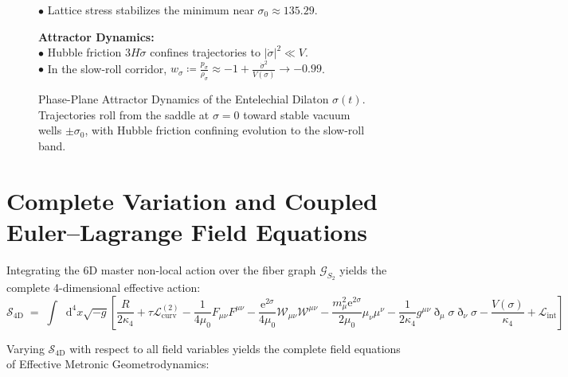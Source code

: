 \documentclass[
    12pt,
    a4paper,
    headings=normal,
    twoside=false,
    open=any,
    parskip=half
]{scrbook}
\newcommand{\ethop}{\eth}
\newcommand{\diff}{\mathop{}\!\mathrm{d}}
\newcommand{\eu}{\mathrm{e}}
\begin{document}
\begin{figure}[htbp]
\begin{tcolorbox}[colback=white, colframe=secondarycolor!70, arc=2mm, boxrule=0.7pt, left=6pt, right=6pt, top=4pt, bottom=4pt, width=\linewidth]
\begin{minipage}[t]{0.48\textwidth}
  $\bullet$ Lattice stress stabilizes the minimum near $\sigma_0 \approx 135.29$.
\end{minipage}\hfill
\begin{minipage}[t]{0.48\textwidth}
  \textbf{\color{accentcolor}Attractor Dynamics:}\\[1pt]
  $\bullet$ Hubble friction $3H\dot{\sigma}$ confines trajectories to $|\dot{\sigma}|^2 \ll V$.\\[1pt]
  $\bullet$ In the slow-roll corridor, $w_\sigma \coloneqq \frac{p_\sigma}{\rho_\sigma} \approx -1 + \frac{\dot{\sigma}^2}{V(\sigma)} \to -0.99$.
\end{minipage}
\end{tcolorbox}
\vspace{-2mm}
\caption{Phase-Plane Attractor Dynamics of the Entelechial Dilaton $\sigma(t)$. Trajectories roll from the saddle at $\sigma=0$ toward stable vacuum wells $\pm\sigma_0$, with Hubble friction confining evolution to the slow-roll band.}
\label{fig:ch2_dilaton_phase_portrait}
\end{figure}

\section{Complete Variation and Coupled Euler--Lagrange Field Equations}
\label{sec:ch2_euler_lagrange_field_equations}

Integrating the 6D master non-local action over the fiber graph $\mathcal{G}_{S_2}$ yields the complete 4-dimensional effective action:
\begin{equation}
\mathcal{S}_{4\text{D}} \;=\; \int \diff^4 x \sqrt{-g} \left[ \frac{R}{2\kappa_4} + \tau \mathcal{L}_{\text{curv}}^{(2)} - \frac{1}{4\mu_0} F_{\mu\nu}F^{\mu\nu} - \frac{\eu^{2\sigma}}{4\mu_0} \mathcal{W}_{\mu\nu}\mathcal{W}^{\mu\nu} - \frac{m_\mu^2 \eu^{2\sigma}}{2\mu_0} \mu_\nu \mu^\nu - \frac{1}{2\kappa_4} g^{\mu\nu}\ethop_\mu\sigma\ethop_\nu\sigma - \frac{V(\sigma)}{\kappa_4} + \mathcal{L}_{\text{int}} \right]
\label{eq:ch2_4d_effective_action_master}
\end{equation}

Varying $\mathcal{S}_{4\text{D}}$ with respect to all field variables yields the complete field equations of Effective Metronic Geometrodynamics:
\end{document}
